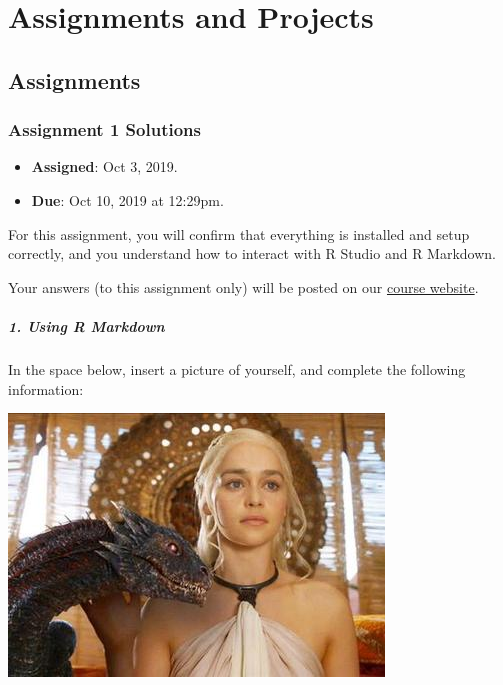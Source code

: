 \documentclass[]{book}
\providecommand{\tightlist}{%
  \setlength{\itemsep}{0pt}\setlength{\parskip}{0pt}}
\begin{document}
\hypertarget{part-assignments-and-projects}{%
\part{Assignments and Projects}\label{part-assignments-and-projects}}

\hypertarget{assignments-1}{%
\chapter{Assignments}\label{assignments-1}}

\hypertarget{assignment-1-solutions}{%
\section{Assignment 1 Solutions}\label{assignment-1-solutions}}

\begin{itemize}
\tightlist
\item
  \textbf{Assigned}: Oct 3, 2019.
\item
  \textbf{Due}: Oct 10, 2019 at 12:29pm.
\end{itemize}

For this assignment, you will confirm that everything is installed and setup correctly, and you understand how to interact with R Studio and R Markdown.

Your answers (to this assignment only) will be posted on our \href{https://github.com/rochelleterman/plsc-31101}{course website}.

\hypertarget{using-r-markdown}{%
\subsubsection*{1. Using R Markdown}\label{using-r-markdown}}

In the space below, insert a picture of yourself, and complete the following information:

\includegraphics{img/dany.jpg}
\end{document}
